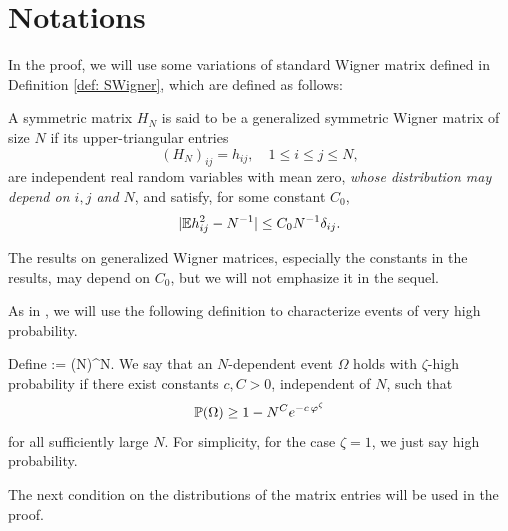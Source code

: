 \section{Notations} \label{sec2}
 
In the proof, we will use some variations of standard Wigner matrix defined in Definition \ref{def: SWigner}, which are defined as follows:

\begin{defn}
A symmetric matrix $H_N$ is said to be a generalized symmetric Wigner matrix of size $N$ if its upper-triangular entries
$$
(H_N)_{ij} = h_{ij}, \quad  1 \leq i \leq j\leq N,
$$ 
are independent real random variables with mean zero, {\it whose distribution may depend on $i,j$ and $N$}, and satisfy, for some constant $C_0$,
\begin{equation} \label{eq:diag}
|\mathbb{E} h_{ij}^2 - N^{-1} |\le C_0 N^{-1} \delta_{ij}.
\end{equation}

\end{defn}

\begin{rem}
The results on generalized Wigner matrices, especially the constants in the results, may depend on $C_0$, but we will not emphasize it in the sequel.
\end{rem}

As in \cite{EKYY1, EKYY2}, we will use the following definition to characterize events of very high probability.

\begin{defn}\label{def: hprob}
Define
\be
\varphi := (\log N)^{\log \log N}.
\ee
We say that an $N$-dependent event $\Omega$ holds with $\zeta$-high probability if there exist constants $c, C>0$, independent of $N$, such that
\begin{equation}
\mathbb{P} (\Omega ) \geq 1- N^C e^{-c \, \varphi^\zeta }
\end{equation}
for all sufficiently large $N$. For simplicity, for the case $\zeta=1$, we just say high probability. 
\end{defn}

The next condition on the distributions of the matrix entries will be used in the proof.
 
